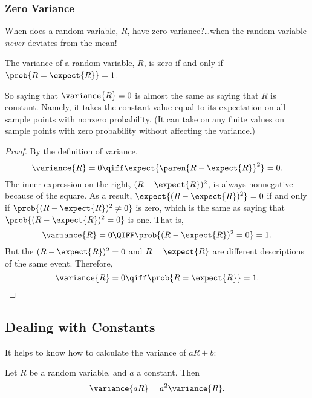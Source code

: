 \begin{editingnotes}

\subsubsection*{Zero Variance}

When does a random variable, $R$, have zero variance?\dots when the random
variable \emph{never} deviates from the mean!
\begin{lemma*}%
The variance of a random variable, $R$, is zero if and only if $\prob{R =
\expect{R}} = 1$.
\end{lemma*}

So saying that $\variance{R}=0$ is almost the same as saying that $R$ is
constant.  Namely, it takes the constant value equal to its expectation on
all sample points with nonzero probability.  (It can take on any finite
values on sample points with zero probability without affecting the
variance.)

\begin{proof}
By the definition of variance,
\[
\variance{R} = 0\qiff \expect{\paren{R - \expect{R}}^2} = 0.
\]
The inner expression on the right, $(R - \expect{R})^2$, is always
nonnegative because of the square.  As a result, $\expect{(R -
\expect{R})^2} = 0$ if and only if $\prob{(R - \expect{R})^2 \neq 0}$ is
zero, which is the same as saying that $\prob{(R - \expect{R})^2 = 0}$ is
one.  That is,
\[
\variance{R} = 0 \QIFF \prob{(R - \expect{R})^2 = 0} = 1.
\]
But the $(R - \expect{R})^2 = 0$ and $R = \expect{R}$ are different
descriptions of the same event.  Therefore,
\[
\variance{R} = 0 \qiff \prob{R = \expect{R}} =1.
\]
\end{proof}

\end{editingnotes}

\subsection{Dealing with Constants}

It helps to know how to calculate the variance of $aR+b$:

\begin{theorem}\label{var.const}
Let $R$ be a random variable, and $a$ a constant. Then
\begin{equation}\label{a2R}
\variance{a R} = a^2 \variance{R}.
\end{equation}
\end{theorem}

